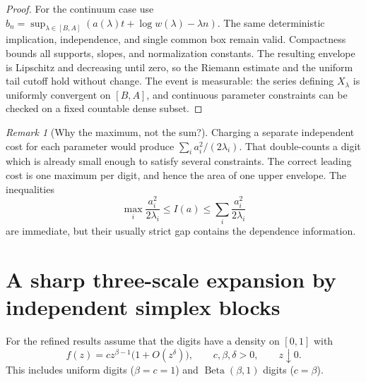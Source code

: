 \documentclass[11pt,a4paper]{article}
\theoremstyle{definition}
\theoremstyle{remark}
\newtheorem{remark}[theorem]{Remark}
\numberwithin{equation}{section}
\begin{document}
\begin{proof}
For the continuum case use
$b_n=\sup_{\lambda\in[B,A]}(a(\lambda)t+\log w(\lambda)-\lambda n)$.
The same deterministic implication, independence, and single common box
remain valid. Compactness bounds all supports, slopes, and normalization
constants. The resulting envelope is Lipschitz and decreasing until zero,
so the Riemann estimate and the uniform tail cutoff hold without change.
The event is measurable: the series defining $X_\lambda$ is uniformly
convergent on $[B,A]$, and continuous parameter constraints can be checked
on a fixed countable dense subset.
\end{proof}

\begin{remark}[Why the maximum, not the sum?]
Charging a separate independent cost for each parameter would produce
$\sum_i a_i^2/(2\lambda_i)$. That double-counts a digit which is already
small enough to satisfy several constraints. The correct leading cost is
one maximum per digit, and hence the area of one upper envelope. The
inequalities
\begin{equation}
 \max_i\frac{a_i^2}{2\lambda_i}\le I(a)
 \le\sum_i\frac{a_i^2}{2\lambda_i}
 \label{eq:rate-bounds}
\end{equation}
are immediate, but their usually strict gap contains the dependence
information.
\end{remark}

\section{A sharp three-scale expansion by independent simplex blocks}
\label{sec:sharp}

For the refined results assume that the digits have a density on $[0,1]$
with
\begin{equation}
 f(z)=c z^{\beta-1}\bigl(1+O(z^\delta)\bigr),
 \qquad c,\beta,\delta>0,
 \qquad z\downarrow0.
 \label{eq:density}
\end{equation}
This includes uniform digits ($\beta=c=1$) and
$\operatorname{Beta}(\beta,1)$ digits ($c=\beta$).
\end{document}
